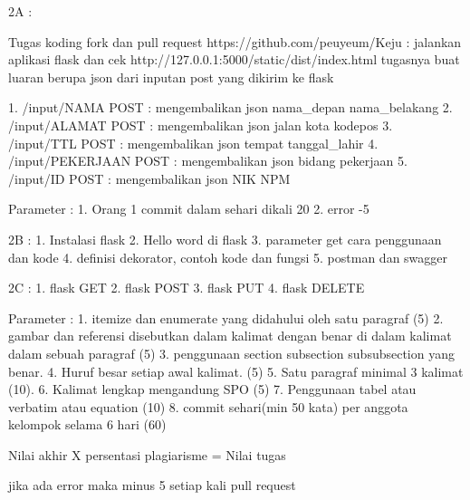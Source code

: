 2A :

Tugas koding fork dan pull request https://github.com/peuyeum/Keju :
jalankan aplikasi flask dan cek http://127.0.0.1:5000/static/dist/index.html
tugasnya buat luaran berupa json dari inputan post yang dikirim ke flask


1. /input/NAMA POST : mengembalikan json nama_depan nama_belakang
2. /input/ALAMAT POST : mengembalikan json jalan kota kodepos
3. /input/TTL POST : mengembalikan json tempat tanggal_lahir
4. /input/PEKERJAAN POST : mengembalikan json bidang pekerjaan
5. /input/ID  POST : mengembalikan json NIK NPM


Parameter :
1. Orang 1 commit dalam sehari dikali 20
2. error -5



2B :
1. Instalasi flask
2. Hello word di flask
3. parameter get cara penggunaan dan kode
4. definisi dekorator, contoh kode dan fungsi
5. postman dan swagger

2C :
1. flask GET
2. flask POST
3. flask PUT
4. flask DELETE



Parameter :
1. itemize dan enumerate yang didahului oleh satu paragraf (5)
2. gambar dan referensi disebutkan dalam kalimat dengan benar di dalam kalimat dalam sebuah paragraf (5)
3. penggunaan section subsection subsubsection yang benar. 
4. Huruf besar setiap awal kalimat. (5)
5. Satu paragraf minimal 3 kalimat (10).
6. Kalimat lengkap mengandung SPO (5)
7. Penggunaan tabel atau verbatim atau equation (10)
8. commit sehari(min 50 kata) per anggota kelompok selama 6 hari (60)

Nilai akhir X persentasi plagiarisme = Nilai tugas


jika ada error maka minus 5 setiap kali pull request